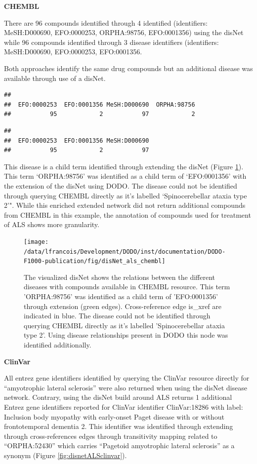 \documentclass[9pt,a4paper,]{extarticle}
\begin{document}
\textbf{CHEMBL}

There are 96 compounds identified through 4 identified (identifiers: MeSH:D000690, EFO:0000253, ORPHA:98756, EFO:0001356) using the disNet while 96 compounds identified through 3 disease identifiers (identifiers: MeSH:D000690, EFO:0000253, EFO:0001356.

Both approaches identify the same drug compounds but an additional disease was available through use of a disNet.

\begin{verbatim}
## 
##  EFO:0000253  EFO:0001356 MeSH:D000690  ORPHA:98756 
##           95            2           97            2
\end{verbatim}

\begin{verbatim}
## 
##  EFO:0000253  EFO:0001356 MeSH:D000690 
##           95            2           97
\end{verbatim}

This disease is a child term identified through extending the disNet (Figure \ref{fig:disnetALSchembl}). This term `ORPHA:98756' was identified as a child term of `EFO:0001356' with the extension of the disNet using DODO. The disease could not be identified through querying CHEMBL directly as it's labelled `Spinocerebellar ataxia type 2'". While this enriched extended network did not return additional compounds from CHEMBL in this example, the annotation of compounds used for treatment of ALS shows more granularity.

\begin{figure}

{\centering \texttt{[image: /data/lfrancois/Development/DODO/inst/documentation/DODO-F1000-publication/fig/disNet\_als\_chembl]} 

}

\caption{The visualized disNet shows the relations between the different diseases with compounds available in CHEMBL resource. This term 'ORPHA:98756' was identified as a child term of 'EFO:0001356' through extension (green edges). Cross-reference edge is\_xref are indicated in blue.  The disease could not be identified through querying CHEMBL directly as it's labelled 'Spinocerebellar ataxia type 2'. Using disease relationships present in DODO this node was identified additionally.}\label{fig:disnetALSchembl}
\end{figure}

\textbf{ClinVar}

All entrez gene identifiers identified by querying the ClinVar resource directly for ``amyotrophic lateral sclerosis'' were also returned when using the disNet disease network. Contrary, using the disNet build around ALS returns 1 additional Entrez gene identifiers reported for ClinVar identifier ClinVar:18286 with label: Inclusion body myopathy with early-onset Paget disease with or without frontotemporal dementia 2. This identifier was identified through extending through cross-references edges through transitivity mapping related to ``ORPHA:52430'' which carries ``Pagetoid amyotrophic lateral sclerosis'' as a synonym (Figure \ref{fig:disnetALSclinvar}).
\end{document}

